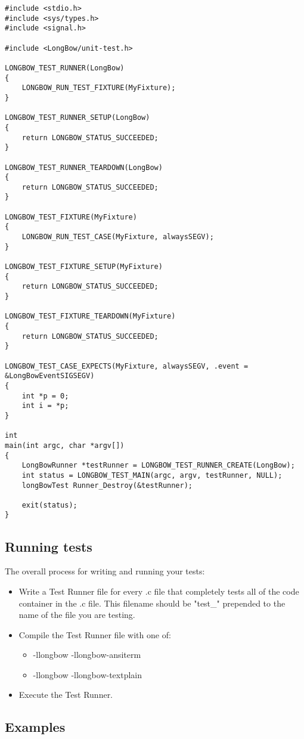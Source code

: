 \begin{lstlisting}
#include <stdio.h>
#include <sys/types.h>
#include <signal.h>

#include <LongBow/unit-test.h>

LONGBOW_TEST_RUNNER(LongBow)
{
	LONGBOW_RUN_TEST_FIXTURE(MyFixture);
}

LONGBOW_TEST_RUNNER_SETUP(LongBow)
{
	return LONGBOW_STATUS_SUCCEEDED;
}

LONGBOW_TEST_RUNNER_TEARDOWN(LongBow)
{
	return LONGBOW_STATUS_SUCCEEDED;
}

LONGBOW_TEST_FIXTURE(MyFixture)
{
	LONGBOW_RUN_TEST_CASE(MyFixture, alwaysSEGV);
}

LONGBOW_TEST_FIXTURE_SETUP(MyFixture)
{
	return LONGBOW_STATUS_SUCCEEDED;
}

LONGBOW_TEST_FIXTURE_TEARDOWN(MyFixture)
{
	return LONGBOW_STATUS_SUCCEEDED;
}

LONGBOW_TEST_CASE_EXPECTS(MyFixture, alwaysSEGV, .event = &LongBowEventSIGSEGV)
{
	int *p = 0;
	int i = *p;
}

int
main(int argc, char *argv[])
{
	LongBowRunner *testRunner = LONGBOW_TEST_RUNNER_CREATE(LongBow);
	int status = LONGBOW_TEST_MAIN(argc, argv, testRunner, NULL);
	longBowTest Runner_Destroy(&testRunner);

	exit(status);
}

\end{lstlisting}

\subsection{Running tests}  

The overall process for writing and running your tests:
\begin{itemize}
\item  Write a Test Runner file for every .c file that completely tests all of the code container in the .c file. This filename should be "test\_" prepended to the name of the file you are testing.
\item  Compile the Test Runner file with one of:
\begin {itemize}
\item  -llongbow -llongbow-ansiterm
\item  -llongbow -llongbow-textplain
\end{itemize}
\item  Execute the Test Runner.
\end{itemize}


\subsection{Examples }  

